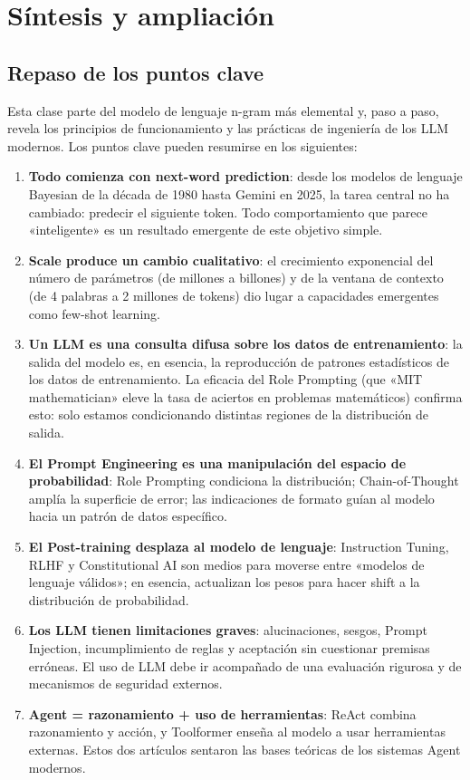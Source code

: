 \section{Síntesis y ampliación}

\subsection{Repaso de los puntos clave}

Esta clase parte del modelo de lenguaje n-gram más elemental y, paso a paso, revela los principios de funcionamiento y las prácticas de ingeniería de los LLM modernos. Los puntos clave pueden resumirse en los siguientes:

\begin{enumerate}
    \item \textbf{Todo comienza con next-word prediction}: desde los modelos de lenguaje Bayesian de la década de 1980 hasta Gemini en 2025, la tarea central no ha cambiado: predecir el siguiente token. Todo comportamiento que parece «inteligente» es un resultado emergente de este objetivo simple.

    \item \textbf{Scale produce un cambio cualitativo}: el crecimiento exponencial del número de parámetros (de millones a billones) y de la ventana de contexto (de 4 palabras a 2 millones de tokens) dio lugar a capacidades emergentes como few-shot learning.

    \item \textbf{Un LLM es una consulta difusa sobre los datos de entrenamiento}: la salida del modelo es, en esencia, la reproducción de patrones estadísticos de los datos de entrenamiento. La eficacia del Role Prompting (que «MIT mathematician» eleve la tasa de aciertos en problemas matemáticos) confirma esto: solo estamos condicionando distintas regiones de la distribución de salida.

    \item \textbf{El Prompt Engineering es una manipulación del espacio de probabilidad}: Role Prompting condiciona la distribución; Chain-of-Thought amplía la superficie de error; las indicaciones de formato guían al modelo hacia un patrón de datos específico.

    \item \textbf{El Post-training desplaza al modelo de lenguaje}: Instruction Tuning, RLHF y Constitutional AI son medios para moverse entre «modelos de lenguaje válidos»; en esencia, actualizan los pesos para hacer shift a la distribución de probabilidad.

    \item \textbf{Los LLM tienen limitaciones graves}: alucinaciones, sesgos, Prompt Injection, incumplimiento de reglas y aceptación sin cuestionar premisas erróneas. El uso de LLM debe ir acompañado de una evaluación rigurosa y de mecanismos de seguridad externos.

    \item \textbf{Agent = razonamiento + uso de herramientas}: ReAct combina razonamiento y acción, y Toolformer enseña al modelo a usar herramientas externas. Estos dos artículos sentaron las bases teóricas de los sistemas Agent modernos.
\end{enumerate}

